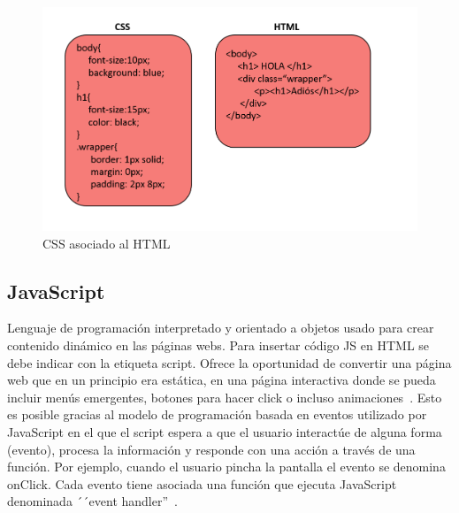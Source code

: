 \documentclass[a4paper, 12pt]{book}
\begin{document}
\begin{figure}[h]
        \centering
        \includegraphics[scale=0.4]{img/cssyhtml.PNG}
        \caption{CSS asociado al HTML}
        \label{figura:css}
\end{figure}

\subsection{JavaScript}
Lenguaje de programación interpretado y orientado a objetos usado para crear contenido dinámico en las páginas webs. Para insertar código JS en HTML se debe indicar con la etiqueta script.  Ofrece la oportunidad de convertir una página web que en un principio era estática, en una página interactiva donde se pueda incluir menús emergentes, botones para hacer click o incluso animaciones~\cite{mdn1}. Esto es posible gracias al modelo de programación basada en eventos utilizado por JavaScript en el que el script espera a que el usuario interactúe de alguna forma (evento), procesa la información y responde con una acción a través de una función. Por ejemplo, cuando el usuario pincha la pantalla el evento se denomina onClick. Cada evento tiene asociada una función que ejecuta JavaScript denominada ´´event handler''~\cite{perez2019introduccion}.
\end{document}
